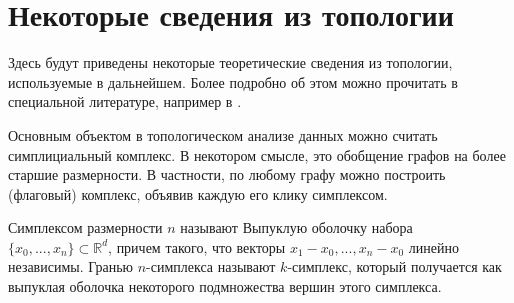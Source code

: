 \section{\centering Некоторые сведения из топологии}
Здесь будут приведены некоторые теоретические сведения из топологии, используемые в дальнейшем. Более подробно об этом можно прочитать в специальной литературе, например в \cite{Viro, Vick, Hatcher}.%

Основным объектом в топологическом анализе данных можно считать симплициальный комплекс. В некотором смысле, это обобщение графов на более старшие размерности. В частности, по любому графу можно построить (флаговый) комплекс, объявив каждую его клику симплексом.

Симплексом размерности $n$ называют Выпуклую оболочку набора $\{ x_0, ..., x_n \} \subset \mathbb{R}^d$, причем такого, что векторы $ x_1 - x_0, ..., x_n - x_0 $ линейно независимы. Гранью $n$-симплекса называют $k$-симплекс, который получается как выпуклая оболочка некоторого подмножества вершин этого симплекса.


